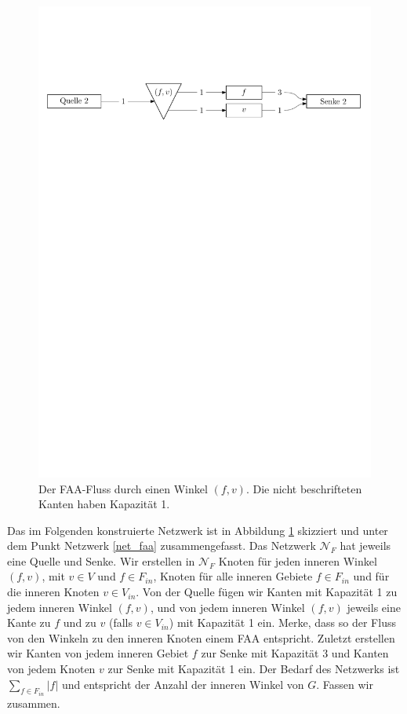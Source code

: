 \begin{figure}
	\centering
  \includegraphics[width=1\textwidth]{faa_flow.pdf}
  \caption{Der FAA-Fluss durch einen Winkel $(f,v)$. Die nicht beschrifteten Kanten haben Kapazität 1.}
  \label{faa_flow}
\end{figure}

Das im Folgenden konstruierte Netzwerk ist in Abbildung \ref{faa_flow} skizziert und unter dem Punkt Netzwerk \ref{net_faa} zusammengefasst. Das Netzwerk $\mathcal{N}_F$ hat jeweils eine Quelle und Senke. Wir erstellen in $\mathcal{N}_F$ Knoten für jeden inneren Winkel $(f,v)$, mit $v\in V$ und $f \in F_{in}$, Knoten für alle inneren Gebiete $f \in F_{in}$ und für die inneren Knoten $v\in V_{in}$. Von der Quelle fügen wir Kanten mit Kapazität 1 zu jedem inneren Winkel $(f,v)$, und von jedem inneren Winkel $(f,v)$ jeweils eine Kante zu $f$ und zu $v$ (falls $v\in V_{in}$) mit Kapazität 1 ein. Merke, dass so der Fluss von den Winkeln zu den inneren Knoten einem FAA entspricht. Zuletzt erstellen wir Kanten von jedem inneren Gebiet $f$ zur Senke mit Kapazität 3 und Kanten von jedem Knoten $v$ zur Senke mit Kapazität 1 ein. Der Bedarf des Netzwerks ist $\sum_{f \in F_{in}}|f|$ und entspricht der Anzahl der inneren Winkel von $G$. Fassen wir zusammen.

